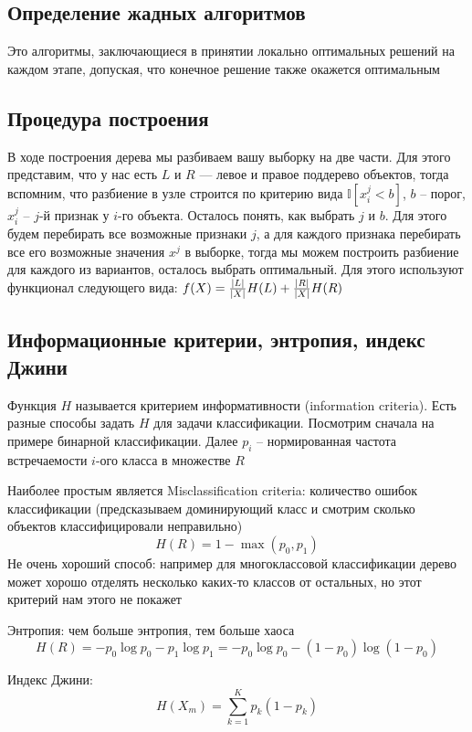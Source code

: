 \subsection{Определение жадных алгоритмов}

Это алгоритмы, заключающиеся в принятии локально оптимальных решений на каждом этапе, допуская, что конечное решение
также окажется оптимальным

\subsection{Процедура построения}

В ходе построения дерева мы разбиваем вашу выборку на две части.
Для этого представим, что у нас есть $L$ и $R$ — левое и правое поддерево объектов, тогда вспомним, что
разбиение в узле строится по критерию вида $\mathbb{I} [x_i^j < b]$, $b$ -- порог, $x_i^j$ -- $j$-й признак у $i$-го
объекта.
Осталось понять, как выбрать $j$ и $b$.
Для этого будем перебирать все возможные признаки $j$, а для каждого признака перебирать все его возможные значения
$x^j$ в выборке, тогда мы можем построить разбиение для каждого из вариантов, осталось выбрать оптимальный.
Для этого используют функционал следующего вида: $f(X) = \frac{\abs{L}}{\abs{X}} H(L) + \frac{\abs{R}}{\abs{X}} H(R)$

\subsection{Информационные критерии, энтропия, индекс Джини}

Функция $H$ называется критерием информативности (information criteria).
Есть разные способы задать $H$  для задачи классификации.
Посмотрим сначала на примере бинарной классификации.
Далее $p_i$ -- нормированная частота встречаемости $i$-ого класса в множестве $R$

Наиболее простым является Misclassification criteria: количество ошибок классификации (предсказываем доминирующий
класс и смотрим сколько объектов классифицировали неправильно)
\[ H(R) = 1 - \max (p_0, p_1) \]
Не очень хороший способ: например для многоклассовой классификации дерево может хорошо отделять несколько каких-то
классов от остальных, но этот критерий нам этого не покажет

Энтропия: чем больше энтропия, тем больше хаоса
\[ H(R) = - p_0 \log p_0 - p_1 \log p_1 = - p_0 \log p_0 - (1 - p_0) \log (1 - p_0) \]

Индекс Джини:
\[ H(X_m) = \sum_{k=1}^K p_k (1 - p_k)\]

